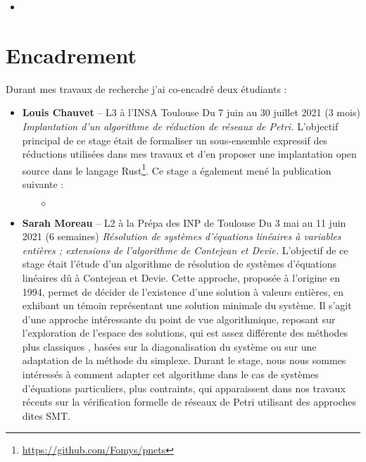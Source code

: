 \begin{itemize}
    \item {}
\end{itemize}


\vspace{10pt}
\section{Encadrement}
\vspace{10pt}

Durant mes travaux de recherche j'ai co-encadré deux étudiants :

\begin{itemize}
  \item \textbf{Louis Chauvet} -- L3 à l'INSA Toulouse
  \smallbreak
  Du 7 juin au 30 juillet 2021 (3 mois)
  \smallbreak
  \textit{Implantation d'un algorithme de réduction de réseaux de Petri.}
  \smallbreak
  L'objectif principal de ce stage était de formaliser un sous-ensemble
  expressif des réductions utilisées dans mes travaux et d'en proposer une
  implantation open source dans le langage
  Rust\footnote{\url{https://github.com/Fomys/pnets}}. Ce stage a également mené
  la publication suivante :
  \begin{itemize}
    \item[$\diamond$] 
  \end{itemize}

  \item \textbf{Sarah Moreau} -- L2 à la Prépa des INP de Toulouse
  \smallbreak
  Du 3 mai au 11 juin 2021 (6 semaines)
  \smallbreak
  \textit{Résolution de systèmes d'équations linéaires à variables entières ; extensions de l'algorithme de Contejean et Devie.}
  \smallbreak
  L'objectif de ce stage était l'étude d'un algorithme de résolution de systèmes
  d'équations linéaires dû à Contejean et Devie. Cette approche, proposée à
  l'origine en 1994, permet de décider de l'existence d'une solution à valeurs
  entières, en exhibant un témoin représentant une solution minimale du système.
  Il s'agit d'une approche intéressante du point de vue algorithmique, reposant
  sur l'exploration de l'espace des solutions, qui est assez différente des
  méthodes \og plus classiques \fg, basées sur la diagonalisation du système ou sur
  une adaptation de la méthode du simplexe. Durant le stage, nous nous sommes
  intéressés à comment adapter cet algorithme dans le cas de systèmes
  d'équations particuliers, plus contraints, qui apparaissent dans nos travaux
  récents sur la vérification formelle de réseaux de Petri utilisant des
  approches dites SMT. 
\end{itemize}








